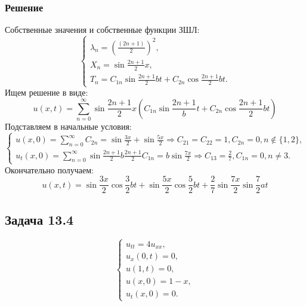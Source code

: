 \documentclass[11pt]{article}
\begin{document}
\subsubsection{Решение}
\label{sec:org8698c6c}
Собственные значения и собственные функции ЗШЛ:
\begin{equation}
\begin{cases}
\lambda_n = \left(\frac{(2n + 1)}2\right)^2, \\
X_n = \sin\frac{2n + 1}2x, \\
T_n = C_{1n}\sin\frac{2n + 1}2bt + C_{2n}\cos\frac{2n + 1}2bt.
\end{cases}
\end{equation}
Ищем решение в виде:
\begin{equation}
u(x, t) = \sum_{n = 0}^{\infty}\sin\frac{2n + 1}2x\left(C_{1n}\sin\frac{2n + 1}bt +
C_{2n}\cos\frac{2n + 1}2bt\right)
\end{equation}
Подставляем в начальные условия:
\begin{equation}
\begin{cases}
u(x, 0) = \sum_{n = 0}^{\infty}C_{2n} = \sin\frac{3x}2 + \sin\frac{5x}2 \Rightarrow C_{21} = C_{22} = 1, C_{2n} = 0, n \notin \{1, 2\}, \\
u_t(x, 0) = \sum_{n = 0}^{\infty}\sin\frac{2n + 1}2b\frac{2n + 1}2C_{1n} = b\sin\frac{7x}2 \Rightarrow C_{13} = \frac27, C_{1n} = 0, n \neq 3.
\end{cases}
\end{equation}
Окончательно получаем:
\begin{equation}
u(x, t) = \sin\frac{3x}2\cos\frac32bt + \sin\frac{5x}2\cos\frac52bt + \frac27\sin\frac{7x}2\sin\frac72at
\end{equation}
\subsection{Задача 13.4}
\label{sec:org6749e12}
\begin{equation}
\begin{cases}
u_{tt} = 4u_{xx}, \\
u_x(0, t) = 0, \\
u(1, t) = 0, \\
u(x, 0) = 1 - x, \\
u_t(x, 0) = 0.
\end{cases}
\end{equation}
\end{document}
